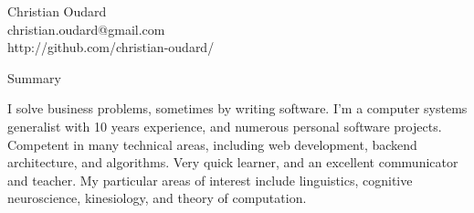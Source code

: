 \documentclass[11pt,oneside]{article}
\begin{document}
\begin{center}
    \textrm{\Huge Christian Oudard} \\
    \vspace{4pt}
    \textsf{
        christian.oudard@gmail.com \\
        http://github.com/christian-oudard/
    }
\end{center}
\vspace{8pt} 

\textrm{\Large Summary}\par
\vspace{8pt}
\textsf{I solve business problems, sometimes by writing software. I'm a computer systems generalist with 10 years experience, and numerous personal software projects. Competent in many technical areas, including web development, backend architecture, and algorithms. Very quick learner, and an excellent communicator and teacher.
My particular areas of interest include linguistics, cognitive neuroscience, kinesiology, and theory of computation.}

\vspace{12pt}
\end{document}
